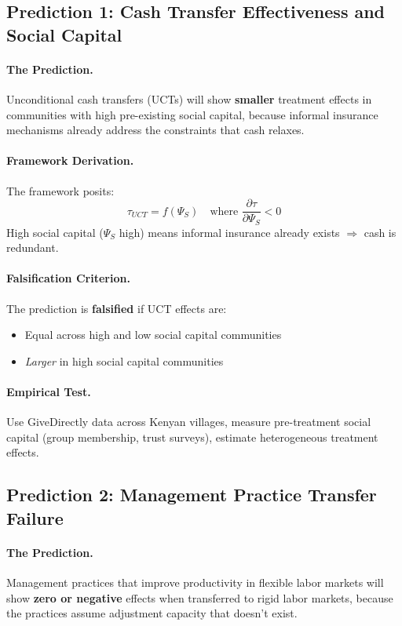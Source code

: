 \documentclass[12pt,a4paper]{article}
\begin{document}
\subsection{Prediction 1: Cash Transfer Effectiveness and Social Capital}

\paragraph{The Prediction.}
Unconditional cash transfers (UCTs) will show \textbf{smaller} treatment effects in communities with high pre-existing social capital, because informal insurance mechanisms already address the constraints that cash relaxes.

\paragraph{Framework Derivation.}
The framework posits:
\begin{equation}
    \tau_{UCT} = f(\Psi_S) \quad \text{where } \frac{\partial \tau}{\partial \Psi_S} < 0
\end{equation}
High social capital ($\Psi_S$ high) means informal insurance already exists $\Rightarrow$ cash is redundant.

\paragraph{Falsification Criterion.}
The prediction is \textbf{falsified} if UCT effects are:
\begin{itemize}
    \item Equal across high and low social capital communities
    \item \textit{Larger} in high social capital communities
\end{itemize}

\paragraph{Empirical Test.}
Use GiveDirectly data across Kenyan villages, measure pre-treatment social capital (group membership, trust surveys), estimate heterogeneous treatment effects.

\subsection{Prediction 2: Management Practice Transfer Failure}

\paragraph{The Prediction.}
Management practices that improve productivity in flexible labor markets will show \textbf{zero or negative} effects when transferred to rigid labor markets, because the practices assume adjustment capacity that doesn't exist.
\end{document}
